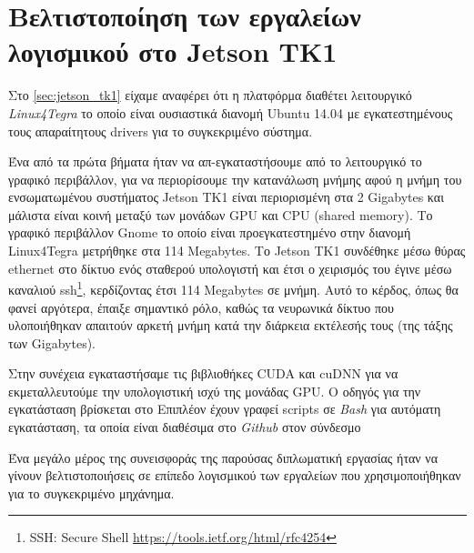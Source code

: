 \section{Βελτιστοποίηση των εργαλείων λογισμικού στο Jetson TK1}
\label{sec:implementations_jetson}

Στο \autoref{sec:jetson_tk1} είχαμε αναφέρει ότι η πλατφόρμα διαθέτει
λειτουργικό \emph{Linux4Tegra} το οποίο είναι ουσιαστικά διανομή Ubuntu 14.04
με εγκατεστημένους τους απαραίτητους drivers για το συγκεκριμένο σύστημα.


Ένα από τα πρώτα βήματα ήταν να απ-εγκαταστήσουμε από το λειτουργικό το
γραφικό περιβάλλον, για να περιορίσουμε την κατανάλωση μνήμης αφού η μνήμη
του ενσωματωμένου συστήματος Jetson TK1 είναι περιορισμένη στα 2 Gigabytes
και μάλιστα είναι κοινή μεταξύ των μονάδων GPU και CPU (shared memory).
Το γραφικό περιβάλλον Gnome
το οποίο είναι προεγκατεστημένο στην διανομή Linux4Tegra μετρήθηκε στα 114 Megabytes.
Το Jetson TK1 συνδέθηκε
μέσω θύρας ethernet στο δίκτυο ενός σταθερού υπολογιστή και έτσι ο χειρισμός
του έγινε μέσω καναλιού ssh\footnote{SSH: Secure Shell \href{https://tools.ietf.org/html/rfc4254}{{https://tools.ietf.org/html/rfc4254}}},
κερδίζοντας έτσι 114 Megabytes σε μνήμη. Αυτό το κέρδος, όπως θα φανεί
αργότερα, έπαιξε σημαντικό ρόλο, καθώς τα νευρωνικά δίκτυο που υλοποιήθηκαν
απαιτούν αρκετή μνήμη κατά την διάρκεια εκτέλεσής τους (της τάξης των Gigabytes).

Στην συνέχεια εγκαταστήσαμε τις βιβλιοθήκες CUDA και cuDNN για να εκμεταλλευτούμε
την υπολογιστική ισχύ της μονάδας GPU. Ο οδηγός για την εγκατάσταση βρίσκεται
στο %
Επιπλέον έχουν γραφεί scripts σε \emph{Bash} για αυτόματη εγκατάσταση, τα
οποία είναι διαθέσιμα στο \emph{Github} στον σύνδεσμο %

Ένα μεγάλο μέρος της συνεισφοράς της παρούσας διπλωματική εργασίας
ήταν να γίνουν βελτιστοποιήσεις σε επίπεδο λογισμικού των εργαλείων που χρησιμοποιήθηκαν
για το συγκεκριμένο μηχάνημα.


